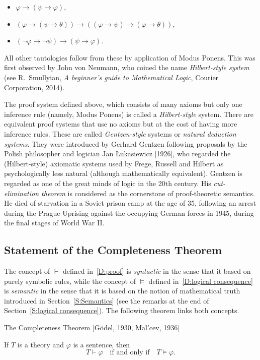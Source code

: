 \documentclass{scrartcl}
\renewcommand{\phi}{\varphi}
\begin{document}
\begin{itemize}
\item
$\phi\to(\psi\to\phi)$,
\item
$(\phi\to(\psi\to\theta))\to ((\phi\to\psi)\to(\phi\to\theta))$,
\item
$(\neg\phi\to\neg\psi)\to (\psi\to\phi)$.
\end{itemize}
All other tautologies follow from these by application of Modus Ponens. This was first observed by John von Neumann, who coined the name \emph{Hilbert-style system} (see R.~Smullyian, \emph{A beginner's guide to Mathematical Logic}, Courier Corporation, 2014).

The proof system defined above, which consists of many axioms but only one inference rule (namely, Modus Ponens) is called a \emph{Hilbert-style} system. There are equivalent proof systems that use no axioms but at the cost of having more inference rules. These are called \emph{Gentzen-style} systems or \emph{natural deduction systems}. They were introduced by Gerhard Gentzen following proposals by the Polish philosopher and logician Jan Łukasiewicz [1926], who regarded the (Hilbert-style) axiomatic systems used by Frege, Russell and Hilbert as psychologically less natural (although mathematically equivalent). Gentzen is regarded as one of the great minds of logic in the 20th century. His \emph{cut-elimination theorem} is  considered as the cornerstone of proof-theoretic semantics. He died of starvation in a Soviet prison camp at the age of 35, following an arrest during the Prague Uprising against the occupying German forces in 1945, during the final stages of World War II.






\subsection{Statement of the Completeness Theorem}
\label{S:Completeness statement}

The concept of $\vdash$ defined in~\ref{D:proof} is \emph{syntactic} in the sense that it based on purely symbolic rules, while the concept of $\models$ defined in~\ref{D:logical consequence} is \emph{semantic} in the sense that it is based on the notion of mathematical truth introduced in Section~\ref{S:Semantics}
(see the remarks at the end of Section~\ref{S:logical consequence}).
The following theorem links both concepts.


\begin{theorem}The Completeness Theorem [G\"odel, 1930, Mal'cev, 1936]
\label{T:completeness}

If $T$ is a theory and $\phi$ is a sentence, then
\[
T\vdash \phi
\quad\text{if and only if}\quad
T\models\phi.
\]

\end{theorem}
\end{document}
